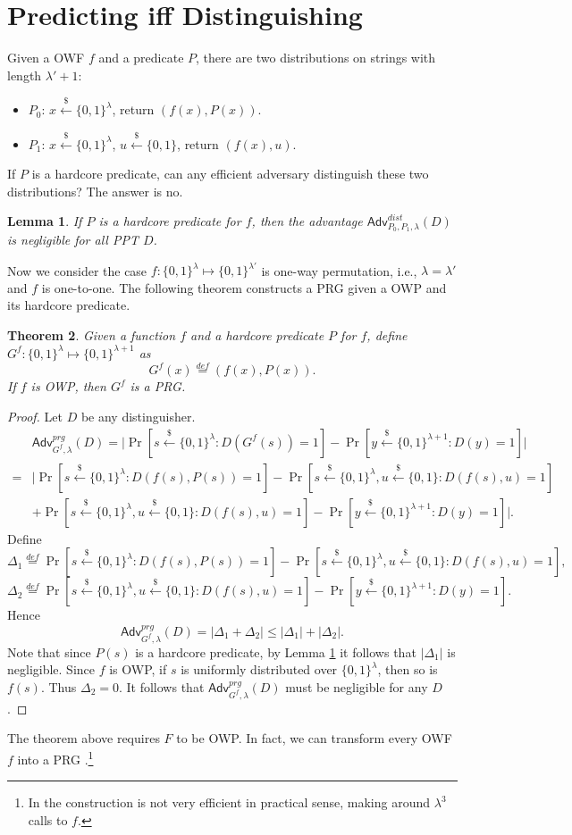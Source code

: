 \documentclass[12pt]{article}
\newcommand{\eqdef}{\stackrel{def}{=}}
\newcommand{\bits}{\{0,1\}}
\newcommand{\getsr}{\stackrel{\$}{\gets}}
\newcommand{\Adv}{\mathsf{Adv}}
\newtheorem{theorem}{Theorem}[section]
\newtheorem{lemma}[theorem]{Lemma}
\theoremstyle{definition}
\begin{document}
\section{Predicting iff Distinguishing}
Given a OWF $f$ and a predicate $P$, there are two distributions on strings with length $\lambda' + 1$:
\begin{itemize}
\item $P_0$: $x \getsr \bits^\lambda$, return $(f(x), P(x))$.
\item $P_1$: $x \getsr \bits^\lambda$, $u \getsr \bits$, return $(f(x), u)$.
\end{itemize}
If $P$ is a hardcore predicate, can any efficient adversary distinguish these two distributions? The answer is no.
\begin{lemma}
\label{lem:pred}
If $P$ is a hardcore predicate for $f$, then the advantage $\Adv_{P_0,P_1,\lambda}^{dist}(D)$ is negligible for all PPT $D$.
\end{lemma}

Now we consider the case $f : \bits^\lambda \mapsto \bits^{\lambda'}$ is one-way permutation, i.e., $\lambda = \lambda'$ and $f$ is one-to-one.
The following theorem constructs a PRG given a OWP and its hardcore predicate.
\begin{theorem}
Given a function $f$ and a hardcore predicate $P$ for $f$, define $G^f : \bits^\lambda \mapsto \bits^{\lambda+1}$ as
$$G^f(x) \eqdef (f(x), P(x)).$$
If $f$ is OWP, then $G^f$ is a PRG.
\end{theorem}
\begin{proof}
Let $D$ be any distinguisher.
$$\begin{aligned}
&\Adv_{G^f, \lambda}^{prg}(D) 
=\bigg| \Pr[s \getsr \bits^\lambda : D(G^f(s)) = 1] - \Pr[y \getsr \bits^{\lambda+1} : D(y) = 1] \bigg| \\
=&\bigg| \Pr[s \getsr \bits^\lambda : D(f(s), P(s)) = 1] - \Pr[s \getsr \bits^\lambda, u \getsr \bits : D(f(s), u) = 1] \\
&+ \Pr[s \getsr \bits^\lambda, u \getsr \bits : D(f(s), u) = 1] - \Pr[y \getsr \bits^{\lambda+1} : D(y) = 1] \bigg|.
\end{aligned}$$
Define
$$\Delta_1 \eqdef \Pr[s \getsr \bits^\lambda : D(f(s), P(s)) = 1] - \Pr[s \getsr \bits^\lambda, u \getsr \bits : D(f(s), u) = 1],$$
$$\Delta_2 \eqdef \Pr[s \getsr \bits^\lambda, u \getsr \bits : D(f(s), u) = 1] - \Pr[y \getsr \bits^{\lambda+1} : D(y) = 1].$$
Hence 
$$\Adv_{G^f, \lambda}^{prg}(D) = |\Delta_1 + \Delta_2| \leq |\Delta_1| + |\Delta_2|.$$
Note that since $P(s)$ is a hardcore predicate, by Lemma \ref{lem:pred} it follows that $|\Delta_1|$ is negligible. Since $f$ is OWP, if $s$ is uniformly distributed over $\bits^\lambda$, then so is $f(s)$. Thus $\Delta_2 = 0$. It follows that $\Adv_{G^f, \lambda}^{prg}(D)$ must be negligible for any $D$.
\end{proof}
The theorem above requires $F$ to be OWP. In fact, we can transform every OWF $f$ into a PRG \cite{HILL99}.\footnote{In \cite{HILL99} the construction is not very efficient in practical sense, making around $\lambda^3$ calls to $f$.}
\end{document}
